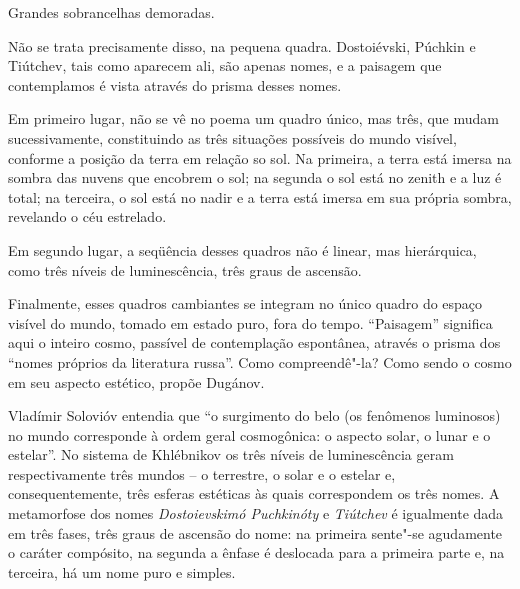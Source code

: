 Grandes sobrancelhas demoradas.

Não se trata precisamente disso, na pequena quadra. Dostoiévski, Púchkin
e Tiútchev, tais como aparecem ali, são apenas nomes, e a paisagem que
contemplamos é vista através do prisma desses nomes.

Em primeiro lugar, não se vê no poema um quadro único, mas três, que
mudam sucessivamente, constituindo as três situações possíveis do mundo
visível, conforme a posição da terra em relação so sol. Na primeira, a
terra está imersa na sombra das nuvens que encobrem o sol; na segunda o
sol está no zenith e a luz é total; na terceira, o sol está no nadir e a
terra está imersa em sua própria sombra, revelando o céu estrelado.

Em segundo lugar, a seqüência desses quadros não é linear, mas
hierárquica, como três níveis de luminescência, três graus de ascensão.

Finalmente, esses quadros cambiantes se integram no único quadro do
espaço visível do mundo, tomado em estado puro, fora do tempo.
``Paisagem'' significa aqui o inteiro cosmo, passível de contemplação
espontânea, através o prisma dos ``nomes próprios da literatura russa''.
Como compreendê"-la? Como sendo o cosmo em seu aspecto estético, propõe
Dugánov.

Vladímir Solovióv entendia que ``o surgimento do belo (os fenômenos
luminosos) no mundo corresponde à ordem geral cosmogônica: o aspecto
solar, o lunar e o estelar''. No sistema de Khlébnikov os três níveis de
luminescência geram respectivamente três mundos -- o terrestre, o solar
e o estelar e, consequentemente, três esferas estéticas às quais
correspondem os três nomes. A metamorfose dos nomes \emph{Dostoievskimó
Puchkinóty} e \emph{Tiútchev} é igualmente dada em três fases, três
graus de ascensão do nome: na primeira sente"-se agudamente o caráter
compósito, na segunda a ênfase é deslocada para a primeira parte e, na
terceira, há um nome puro e simples.

